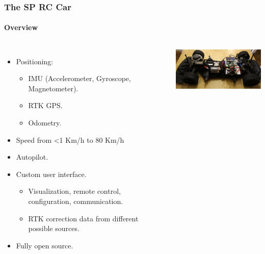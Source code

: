 \documentclass[aspectratio=169,electronics,notopline]{beamer}
\begin{document}
\begin{frame} 
\frametitle{The SP RC Car}
\framesubtitle{Overview}
\begin{columns}[c]
\begin{itemize}
\item Positioning:
	\begin{itemize}
	\item IMU (Accelerometer, Gyroscope,  Magnetometer).
	\item RTK GPS.
	\item Odometry.
	\end{itemize}
\item Speed from <1 Km/h to 80 Km/h
\item Autopilot.
\item Custom user interface.
\begin{itemize}
\item Visualization, remote control, configuration, communication.
\item RTK correction data from different possible sources.
\end{itemize}
\item Fully open source.
\end{itemize}
\begin{center}
	\includegraphics[width=6cm]{Figures/car_2.jpg}
\end{center}
\end{columns}
\end{frame}
\end{document}
